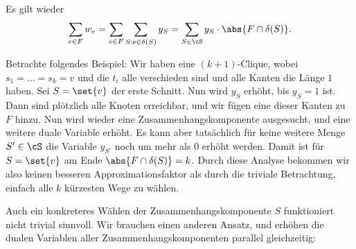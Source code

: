 \documentclass[language=ngerman,algolist]{TemplateLecture}
\begin{document}
Es gilt wieder 
\begin{equation*}
    \sum_{e \in F} w_e = \sum_{e \in F} \sum_{S: e \in \delta(S)} y_S = \sum_{S \in \cS} y_S \cdot \abs{F \cap \delta(S)}.
\end{equation*}

Betrachte folgendes Beispiel: Wir haben eine $(k+1)$-Clique, wobei $s_1 = \dots = s_k = v$ und die $t_i$ alle verschieden sind und alle Kanten die Länge $1$ haben. Sei $S = \set{v}$ der erste Schnitt. Nun wird $y_S$ erhöht, bis $y_S = 1$ ist. Dann sind plötzlich alle Knoten erreichbar, und wir fügen eine dieser Kanten zu $F$ hinzu. Nun wird wieder eine Zusammenhangskomponente ausgesucht, und eine weitere duale Variable erhöht. Es kann aber tatsächlich für keine weitere Menge $S' \in \cS$ die Variable $y_{S'}$ noch um mehr als $0$ erhöht werden. Damit ist für $S = \set{v}$ am Ende $\abs{F \cap \delta(S)} = k$. Durch diese Analyse bekommen wir also keinen besseren Approximationsfaktor als durch die triviale Betrachtung, einfach alle $k$ kürzesten Wege zu wählen.

Auch ein konkreteres Wählen der Zusammenhangskomponente $S$ funktioniert nicht trivial sinnvoll. Wir brauchen einen anderen Ansatz, und erhöhen die dualen Variablen aller Zusammenhangskomponenten parallel gleichzeitig:



\begin{algorithm}[h]
    \caption{\textsc{PrimalDual-SteinerForest2}}\label{alg:primalDualSteinerForest2}
    \begin{algorithmic}[1]
         
         
        \EndWhile{}
            \EndIf{}
        \EndFor{}
    \end{algorithmic}
\end{algorithm}
\end{document}
